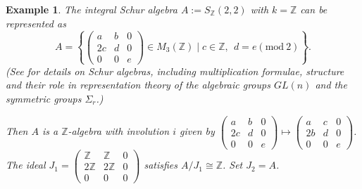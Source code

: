 \documentclass[oneside, a4paper, 11pt]{amsart}
\newtheorem{example}[theorem]{Example}
\newcommand{\ZZ}{\mathbb{Z}}
\begin{document}
\begin{example}
  The integral Schur algebra $A:=S_{\mathbb Z}(2,2)$ with $k=\mathbb{Z}$ can
  be represented as 
  $$A=\left\{  \left(\begin{array}{ccc} a & b & 0\\ 2c & d & 0 \\ 0 & 0 & e\end{array}\right) \in M_3(\ZZ)  \mid  c\in \ZZ,\:\: d = e (\mathrm{mod}\: 2)\right\}.$$ 
  (See \cite{Green} for details on Schur algebras, including multiplication
  formulae, structure and their role in representation theory of the
  algebraic groups $GL(n)$ and the symmetric groups $\Sigma_r$.)

Then $A$ is a $\ZZ$-algebra with involution $i$ given by $\left(\begin{array}{ccc} a & b & 0 \\ 2c & d & 0 \\ 0&0&e\end{array}\right)  \mapsto \left(\begin{array}{ccc} a & c & 0 \\ 2b & d & 0 \\ 0 & 0 & e\end{array}\right)$. The ideal 
    $J_1=  \left(\begin{array}{ccc} \ZZ & \ZZ & 0 \\ 2\ZZ & 2\ZZ &0 \\ 0 & 0 & 0 \end{array}\right)$ 
    satisfies $A/J_1\cong \ZZ$. Set $J_2=A$.

\end{example}
\end{document}
